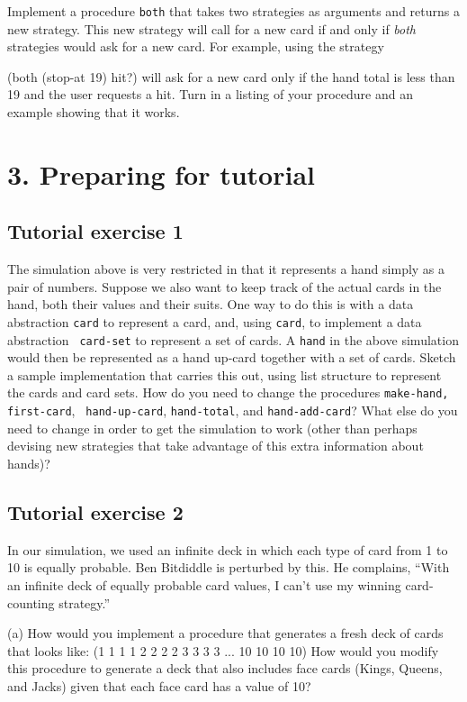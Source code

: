 Implement a procedure {\tt both} that takes two strategies as
arguments and returns a new strategy.  This new strategy will call for
a new card if and only if {\em both} strategies would ask for a new
card.  For example, using the strategy

\beginlisp
(both (stop-at 19) hit?)
\endlisp
 will ask for a new card only if the hand total is less than 19 and
the user requests a hit.  Turn in a listing of your procedure and an
example showing that it works.


\section{3. Preparing for tutorial}

\subsection{Tutorial exercise 1}

The simulation above is very restricted in that it represents a hand
simply as a pair of numbers.  Suppose we also want to keep track of
the actual cards in the hand, both their values and their suits.  One
way to do this is with a data abstraction {\tt card} to represent a
card, and, using {\tt card}, to implement a data abstraction {\tt
card-set} to represent a set of cards.  A {\tt hand} in the above
simulation would then be represented as a hand up-card together with a
set of cards.  Sketch a sample implementation that carries this out,
using list structure to represent the cards and card sets.  How do you
need to change the procedures {\tt make-hand, first-card}, {\tt
hand-up-card}, {\tt hand-total}, and {\tt hand-add-card}?  What else
do you need to change in order to get the simulation to work (other
than perhaps devising new strategies that take advantage of this extra
information about hands)?

\subsection{Tutorial exercise 2}

In our simulation, we used an infinite deck in which each type of card
from 1 to 10 is equally probable.  Ben Bitdiddle is perturbed by this.
He complains, ``With an infinite deck of equally probable card values,
I can't use my winning card-counting strategy.''

(a) How would you implement a procedure that generates a fresh deck of
cards that looks like:
\beginlisp
(1 1 1 1 2 2 2 2 3 3 3 3 ... 10 10 10 10)
\endlisp
How would you modify this procedure to generate a deck that also
includes face cards (Kings, Queens, and Jacks) given that each face
card has a value of 10?

